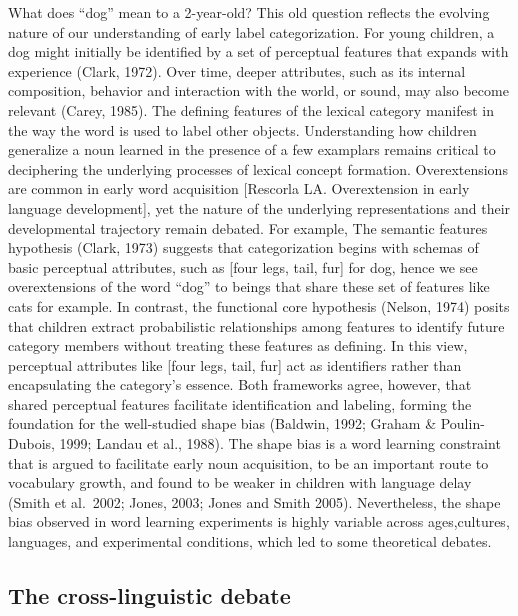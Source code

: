 \documentclass[10pt, letterpaper]{article}
\begin{document}
What does ``dog'' mean to a 2-year-old? This old question reflects the
evolving nature of our understanding of early label categorization. For
young children, a dog might initially be identified by a set of
perceptual features that expands with experience (Clark, 1972). Over
time, deeper attributes, such as its internal composition, behavior and
interaction with the world, or sound, may also become relevant (Carey,
1985). The defining features of the lexical category manifest in the way
the word is used to label other objects. Understanding how children
generalize a noun learned in the presence of a few examplars remains
critical to deciphering the underlying processes of lexical concept
formation. Overextensions are common in early word acquisition
{[}Rescorla LA. Overextension in early language development{]}, yet the
nature of the underlying representations and their developmental
trajectory remain debated. For example, The semantic features hypothesis
(Clark, 1973) suggests that categorization begins with schemas of basic
perceptual attributes, such as {[}four legs, tail, fur{]} for dog, hence
we see overextensions of the word ``dog'' to beings that share these set
of features like cats for example. In contrast, the functional core
hypothesis (Nelson, 1974) posits that children extract probabilistic
relationships among features to identify future category members without
treating these features as defining. In this view, perceptual attributes
like {[}four legs, tail, fur{]} act as identifiers rather than
encapsulating the category's essence. Both frameworks agree, however,
that shared perceptual features facilitate identification and labeling,
forming the foundation for the well-studied shape bias (Baldwin, 1992;
Graham \& Poulin-Dubois, 1999; Landau et al., 1988). The shape bias is a
word learning constraint that is argued to facilitate early noun
acquisition, to be an important route to vocabulary growth, and found to
be weaker in children with language delay (Smith et al.~2002; Jones,
2003; Jones and Smith 2005). Nevertheless, the shape bias observed in
word learning experiments is highly variable across ages,cultures,
languages, and experimental conditions, which led to some theoretical
debates.

\hypertarget{the-cross-linguistic-debate}{%
\subsection{The cross-linguistic
debate}\label{the-cross-linguistic-debate}}
\end{document}
